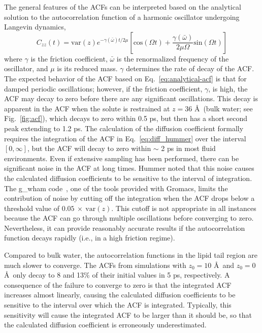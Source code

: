 \par The general features of the ACFs can be interpreted based on the analytical solution to the autocorrelation function of a harmonic oscillator undergoing Langevin dynamics,~\cite{Tuckerman2010}
\begin{equation}
C_{zz}(t) = \textrm{var}(z) e^{-\gamma(\bar \omega)t/2\mu}[ \textrm{cos}(\Omega t) + \frac{\gamma(\bar \omega)}{2 \mu \Omega } \textrm{sin}(\Omega t)]
\label{eq:analytical-acf}
\end{equation}
where $\gamma$ is the friction coefficient, $\bar \omega$ is the renormalized frequency of the oscillator, and $\mu$ is its reduced mass. $\gamma$ determines the rate of decay of the ACF. The expected behavior of the ACF based on Eq.~\ref{eq:analytical-acf} is that for damped periodic oscillations; however, if the friction coefficient, $\gamma$, is high, the ACF may decay to zero before there are any significant oscillations. This decay is apparent in the ACF when the solute is restrained at  $z=36$ \AA\ (bulk water; see Fig.~\ref{fig:acf}), which decays to zero within 0.5 ps, but then has a short second peak extending to 1.2 ps. The calculation of the diffusion coefficient formally requires the integration of the ACF in Eq.~\ref{eq:diff_hummer} over the interval $[0, \infty]$, but the ACF will  decay to zero within $\sim$ 2 ps in most fluid environments. Even if extensive sampling has been performed, there can be significant noise in the ACF at long times. Hummer noted that this noise causes the calculated diffusion coefficients to be sensitive to the interval of integration.~\cite{Hummer2005} The g\_wham code~\cite{Hub2010}, one of the tools provided with Gromacs, limits the contribution of noise by cutting off the integration when the ACF drops below a threshold value of $0.05\ \times\ \textrm{var}(z)$.  This cutoff is not appropriate in all instances because the ACF can go through multiple oscillations before converging to zero. Nevertheless, it can provide reasonably accurate results if the autocorrelation function decays rapidly (i.e., in a high friction regime).

\par Compared to bulk water, the autocorrelation functions in the lipid tail region are much slower to converge.  The ACFs from simulations with $z_0=10$ \AA\ and $z_0=0$ \AA\ only decay to 8 and 13\% of their initial values in 5 ps, respectively. A consequence of the
failure to converge to zero is that the integrated ACF increases almost linearly,
causing the calculated diffusion coefficients to be sensitive
to the interval over which the ACF is integrated.  Typically, this sensitivity will cause
the integrated ACF to be larger than it should be, so that the calculated diffusion coefficient is erroneously underestimated.

